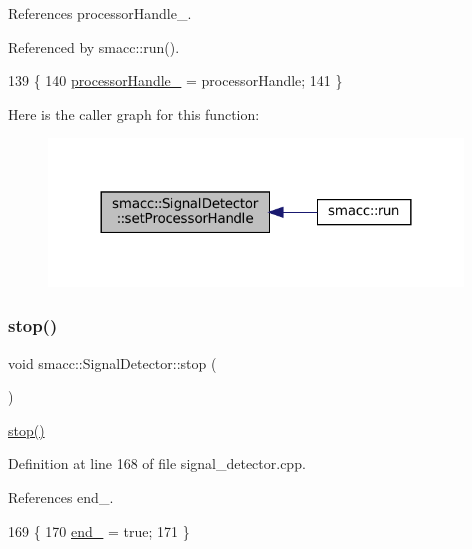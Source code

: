 References processor\+Handle\+\_\+.



Referenced by smacc\+::run().


\begin{DoxyCode}
139     \{
140         \hyperlink{classsmacc_1_1SignalDetector_a9a77dc9f0e9f8f56dff5e76077abcb78}{processorHandle\_} = processorHandle;
141     \}
\end{DoxyCode}
Here is the caller graph for this function\+:
\nopagebreak
\begin{figure}[H]
\begin{center}
\leavevmode
\includegraphics[width=312pt]{classsmacc_1_1SignalDetector_ac1197a77c32a3b817005391e550ce646_icgraph}
\end{center}
\end{figure}
\mbox{\label{classsmacc_1_1SignalDetector_a536ea005ea4ef4632c0c9c1c62c557a3}} 
\subsubsection{\texorpdfstring{stop()}{stop()}}
{\footnotesize\ttfamily void smacc\+::\+Signal\+Detector\+::stop (\begin{DoxyParamCaption}{ }\end{DoxyParamCaption})}

\hyperlink{classsmacc_1_1SignalDetector_a536ea005ea4ef4632c0c9c1c62c557a3}{stop()} 

Definition at line 168 of file signal\+\_\+detector.\+cpp.



References end\+\_\+.


\begin{DoxyCode}
169     \{
170         \hyperlink{classsmacc_1_1SignalDetector_aaee266393c01693528a2d74b1f2354a2}{end\_} = \textcolor{keyword}{true};
171     \}
\end{DoxyCode}


